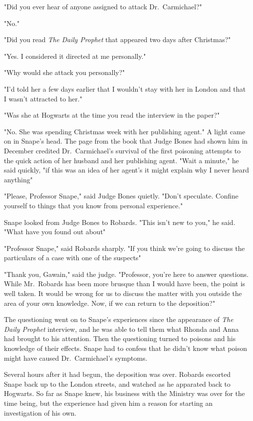 "Did you ever hear of anyone assigned to attack Dr.~Carmichael?"

"No."

"Did you read \emph{The Daily Prophet} that appeared two days after Christmas?"

"Yes. I considered it directed at me personally."

"Why would she attack you personally?"

"I'd told her a few days earlier that I wouldn't stay with her in London and that I wasn't attracted to her."

"Was she at Hogwarts at the time you read the interview in the paper?"

"No. She was spending Christmas week with her publishing agent." A light came on in Snape's head. The page from the book that Judge Bones had shown him in December credited Dr.~Carmichael's survival of the first poisoning attempts to the quick action of her husband and her publishing agent. "Wait a minute," he said quickly, "if this was an idea of her agent's it might explain why I never heard anything{\el}"

"Please, Professor Snape," said Judge Bones quietly. "Don't speculate. Confine yourself to things that you know from personal experience."

Snape looked from Judge Bones to Robards. "This isn't new to you," he said. "What have you found out about{\el}"

"Professor Snape," said Robards sharply. "If you think we're going to discuss the particulars of a case with one of the suspects{\el}"

"Thank you, Gawain," said the judge. "Professor, you're here to answer questions. While Mr.~Robards has been more brusque than I would have been, the point is well taken. It would be wrong for us to discuss the matter with you outside the area of your own knowledge. Now, if we can return to the deposition?"

The questioning went on to Snape's experiences since the appearance of \emph{The Daily Prophet} interview, and he was able to tell them what Rhonda and Anna had brought to his attention. Then the questioning turned to poisons and his knowledge of their effects. Snape had to confess that he didn't know what poison might have caused Dr.~Carmichael's symptoms.

Several hours after it had begun, the deposition was over. Robards escorted Snape back up to the London streets, and watched as he apparated back to Hogwarts. So far as Snape knew, his business with the Ministry was over for the time being, but the experience had given him a reason for starting an investigation of his own.

